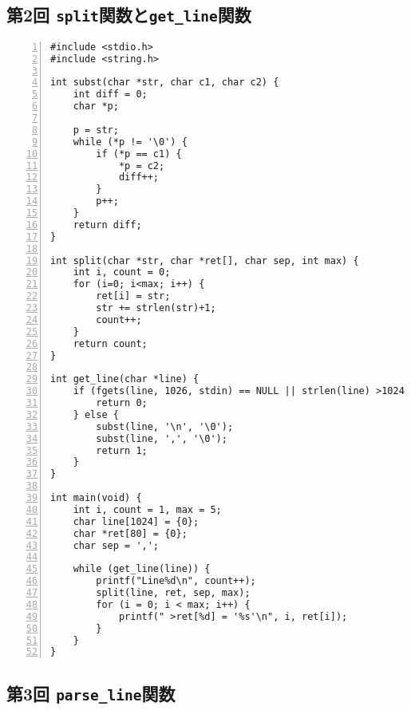 \documentclass[autodetect-engine,dvi=dvipdfmx,ja=standard,
               a4j,11pt]{bxjsarticle}
\begin{document}
\subsection{第2回 \texttt{split}関数と\texttt{get\_line}関数} \label{code:2}

\begin{Verbatim}[numbers=left, xleftmargin=10mm, numbersep=6pt,
    fontsize=\small, baselinestretch=0.8]
#include <stdio.h>
#include <string.h>

int subst(char *str, char c1, char c2) {
    int diff = 0;
    char *p;

    p = str;
    while (*p != '\0') {
        if (*p == c1) {
            *p = c2;
            diff++;
        }
        p++;
    }
    return diff;
}

int split(char *str, char *ret[], char sep, int max) {
    int i, count = 0;
    for (i=0; i<max; i++) {
        ret[i] = str;
        str += strlen(str)+1;
        count++;
    }
    return count;
}

int get_line(char *line) {
    if (fgets(line, 1026, stdin) == NULL || strlen(line) >1024 || *line == '\n') {
        return 0;
    } else {
        subst(line, '\n', '\0');
        subst(line, ',', '\0');
        return 1;
    }
}

int main(void) {
    int i, count = 1, max = 5;
    char line[1024] = {0};
    char *ret[80] = {0};
    char sep = ',';

    while (get_line(line)) {
        printf("Line%d\n", count++);
        split(line, ret, sep, max);
        for (i = 0; i < max; i++) {
            printf(" >ret[%d] = '%s'\n", i, ret[i]);
        }
    }
}

\end{Verbatim}

\subsection{第3回 \texttt{parse\_line}関数} \label{code:3}
\end{document}
